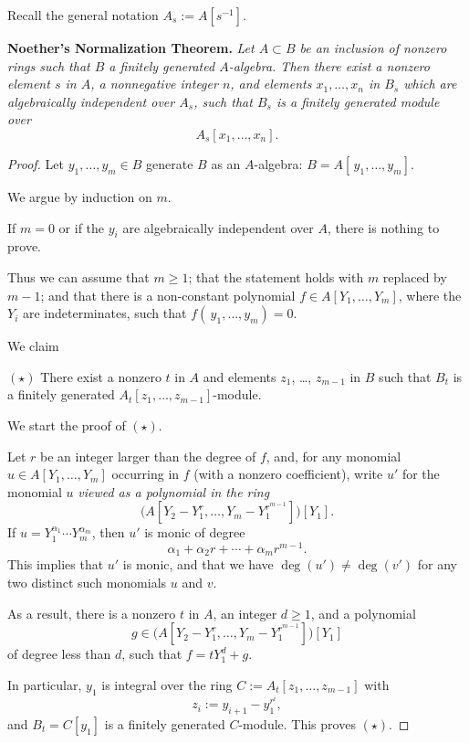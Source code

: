 \documentclass[parskip=half,fontsize=12pt]{scrartcl}%
\begin{document}
Recall the general notation $A_s:=A[s^{-1}]$.%

\textbf{Noether's Normalization Theorem.} \emph{Let $A\subset B$ be an inclusion of nonzero rings such that $B$ a finitely generated $A$-algebra. Then there exist a nonzero element $s$ in $A$, a nonnegative integer $n$, and elements $x_1,\dots,x_n$ in $B_s$ which are algebraically independent over $A_s$, such that $B_s$ is a finitely generated module over} 
$$
A_s[x_1,\dots,x_n].
$$ 
\begin{proof} 
Let $y_1,\dots,y_m\in B$ generate $B$ as an $A$-algebra: $B=A[\,y_1,\dots,y_m]$. 

We argue by induction on $m$. 

If $m=0$ or if the $y_i$ are algebraically independent over $A$, there is nothing to prove.

Thus we can assume that $m\ge1$; that the statement holds with $m$ replaced by $m-1$; and that there is a non-constant polynomial $f\in A[Y_1,\dots,Y_m]$, where the $Y_i$ are indeterminates, such that $f(\,y_1,\dots,y_m)=0$. %

We claim

$(\star)$ There exist a nonzero $t$ in $A$ and elements $z_1$, \dots, $z_{m-1}$ in $B$ such that $B_t$ is a finitely generated $A_t[z_1,\dots,z_{m-1}]$-module. 

We start the proof of $(\star)$. 

Let $r$ be an integer larger than the degree of $f$, and, for any monomial $u\in A[Y_1,\dots,Y_m]$ occurring in $f$ (with a nonzero coefficient), write $u'$ for the monomial $u$ \emph{viewed as a polynomial in the ring} 
$$
\bigg(A\left[Y_2-Y_1^r,\dots,Y_m-Y_1^{r^{m-1}}\right]\bigg)[Y_1].
$$ 
If $u=Y_1^{\alpha_1}\cdots Y_m^{\alpha_m}$, then $u'$ is monic of degree 
$$
\alpha_1+\alpha_2r+\cdots+\alpha_mr^{m-1}.
$$ 
This implies that $u'$ is monic, and that we have $\deg(u')\ne\deg(v')$ for any two distinct such monomials $u$ and $v$. %

As a result, there is a nonzero $t$ in $A$, an integer $d\ge1$, and a polynomial 
$$
g\in\bigg(A\left[Y_2-Y_1^r,\dots,Y_m-Y_1^{r^{m-1}}\right]\bigg)[Y_1]
$$ 
of degree less than $d$, such that $f=tY_1^d+g$. 

In particular, $y_1$ is integral over the ring $C:=A_t[z_1,\dots,z_{m-1}]$ 
with 
$$
z_i:=y_{i+1}-y_1^{r^i},
$$ 
and $B_t=C[y_1]$ is a finitely generated $C$-module. This proves $(\star)$.


\end{proof}
\end{document}

